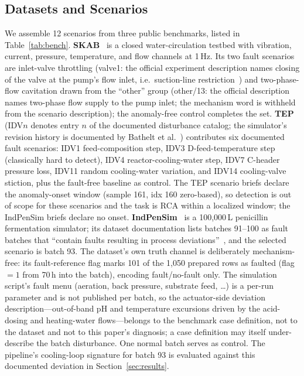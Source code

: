 \documentclass[preprint,10pt]{elsarticle}
\begin{document}
\subsection{Datasets and Scenarios}
We assemble 12 scenarios from three public benchmarks, listed in Table~\ref{tab:bench}. \textbf{SKAB}~\cite{skab2020} is a closed water-circulation testbed with vibration, current, pressure, temperature, and flow channels at 1\,Hz. Its two fault scenarios are inlet-valve throttling (valve1: the official experiment description names closing of the valve at the pump's flow inlet, i.e.\ suction-line restriction~\cite{skab2020}) and two-phase-flow cavitation drawn from the ``other'' group (other/13: the official description names two-phase flow supply to the pump inlet; the mechanism word is withheld from the scenario description); the anomaly-free control completes the set. \textbf{TEP}~\cite{downs1993plant,lyman1995plant,rieth2017additional} (IDV$n$ denotes entry $n$ of the documented disturbance catalog; the simulator's revision history is documented by Bathelt et al.~\cite{bathelt2015revision}) contributes six documented fault scenarios: IDV1 feed-composition step, IDV3 D-feed-temperature step (classically hard to detect), IDV4 reactor-cooling-water step, IDV7 C-header pressure loss, IDV11 random cooling-water variation, and IDV14 cooling-valve stiction, plus the fault-free baseline as control. The TEP scenario briefs declare the anomaly-onset window (sample 161, idx 160 zero-based), so detection is out of scope for these scenarios and the task is RCA within a localized window; the IndPenSim briefs declare no onset. \textbf{IndPenSim}~\cite{goldrick2015development,goldrick2019modern} is a 100{,}000\,L penicillin fermentation simulator; its dataset documentation lists batches 91--100 as fault batches that ``contain faults resulting in process deviations''~\cite{goldrick2019modern}, and the selected scenario is batch 93. The dataset's own truth channel is deliberately mechanism-free: its fault-reference flag marks 101 of the 1,050 prepared rows as faulted (flag $=1$ from 70\,h into the batch), encoding fault/no-fault only. The simulation script's fault menu (aeration, back pressure, substrate feed, \dots) is a per-run parameter and is not published per batch, so the actuator-side deviation description---out-of-band pH and temperature excursions driven by the acid-dosing and heating-water flows---belongs to the benchmark case definition, not to the dataset and not to this paper's diagnosis; a case definition may itself under-describe the batch disturbance. One normal batch serves as control. The pipeline's cooling-loop signature for batch 93 is evaluated against this documented deviation in Section~\ref{sec:results}. 
\end{document}
